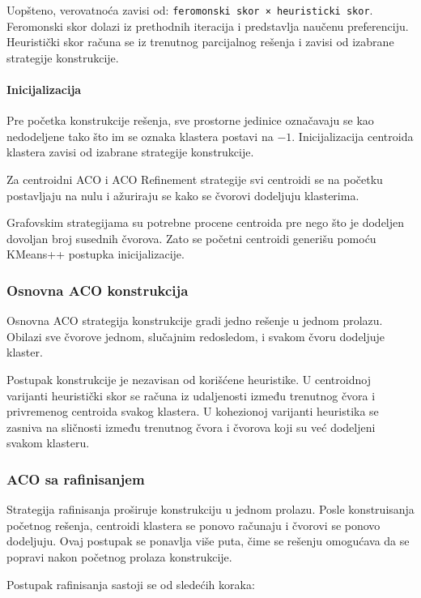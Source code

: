 \documentclass[11pt]{article}
\begin{document}
Uopšteno, verovatnoća zavisi od: \texttt{feromonski skor × heuristicki skor}. Feromonski skor dolazi iz prethodnih iteracija i predstavlja naučenu preferenciju. Heuristički skor računa se iz trenutnog parcijalnog rešenja i zavisi od izabrane strategije konstrukcije.

\paragraph{Inicijalizacija}

Pre početka konstrukcije rešenja, sve prostorne jedinice označavaju se kao nedodeljene tako što im se oznaka klastera postavi na $-1$. Inicijalizacija centroida klastera zavisi od izabrane strategije konstrukcije.

Za centroidni ACO i ACO Refinement strategije svi centroidi se na početku postavljaju na nulu i ažuriraju se kako se čvorovi dodeljuju klasterima.

Grafovskim strategijama su potrebne procene centroida pre nego što je dodeljen dovoljan broj susednih čvorova. Zato se početni centroidi generišu pomoću KMeans++ postupka inicijalizacije.

\subsubsection{Osnovna ACO konstrukcija}

Osnovna ACO strategija konstrukcije gradi jedno rešenje u jednom prolazu. Obilazi sve čvorove jednom, slučajnim redosledom, i svakom čvoru dodeljuje klaster.

Postupak konstrukcije je nezavisan od korišćene heuristike. U centroidnoj varijanti heuristički skor se računa iz udaljenosti između trenutnog čvora i privremenog centroida svakog klastera. U kohezionoj varijanti heuristika se zasniva na sličnosti između trenutnog čvora i čvorova koji su već dodeljeni svakom klasteru.

\subsubsection{ACO sa rafinisanjem}

Strategija rafinisanja proširuje konstrukciju u jednom prolazu. Posle konstruisanja početnog rešenja, centroidi klastera se ponovo računaju i čvorovi se ponovo dodeljuju. Ovaj postupak se ponavlja više puta, čime se rešenju omogućava da se popravi nakon početnog prolaza konstrukcije.

Postupak rafinisanja sastoji se od sledećih koraka:
\end{document}
